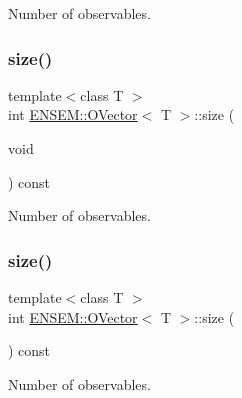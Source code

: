 Number of observables. 

\mbox{\label{classENSEM_1_1OVector_a715979c319905eb60532815bb3c77aab}} 
\subsubsection{\texorpdfstring{size()}{size()}\hspace{0.1cm}{\footnotesize\ttfamily [2/3]}}
{\footnotesize\ttfamily template$<$class T $>$ \\
int \mbox{\hyperlink{classENSEM_1_1OVector}{E\+N\+S\+E\+M\+::\+O\+Vector}}$<$ T $>$\+::size (\begin{DoxyParamCaption}\item[{void}]{ }\end{DoxyParamCaption}) const\hspace{0.3cm}{\ttfamily [inline]}}



Number of observables. 

\mbox{\label{classENSEM_1_1OVector_a715979c319905eb60532815bb3c77aab}} 
\subsubsection{\texorpdfstring{size()}{size()}\hspace{0.1cm}{\footnotesize\ttfamily [3/3]}}
{\footnotesize\ttfamily template$<$class T $>$ \\
int \mbox{\hyperlink{classENSEM_1_1OVector}{E\+N\+S\+E\+M\+::\+O\+Vector}}$<$ T $>$\+::size (\begin{DoxyParamCaption}{ }\end{DoxyParamCaption}) const\hspace{0.3cm}{\ttfamily [inline]}}



Number of observables. 

